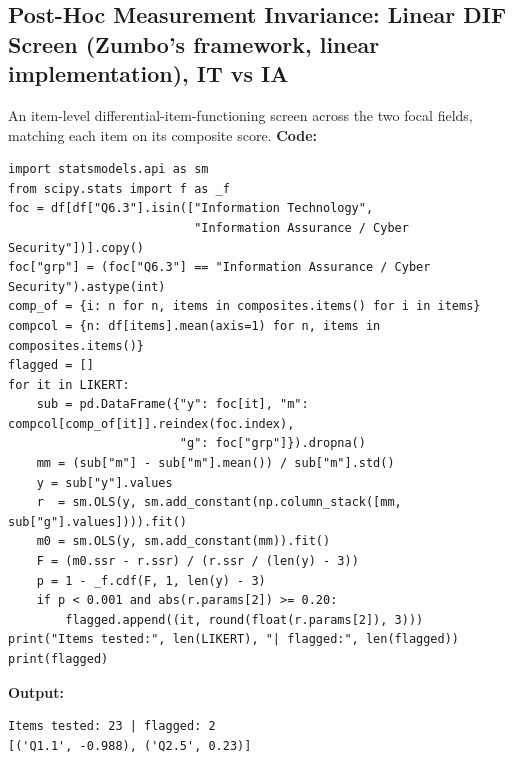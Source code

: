 \subsection{Post-Hoc Measurement Invariance: Linear DIF Screen (Zumbo's framework, linear implementation), IT vs IA}
An item-level differential-item-functioning screen across the two focal fields, matching each item on its composite score.
\noindent\textbf{Code:}\nopagebreak
{\tiny\begin{verbatim}
import statsmodels.api as sm
from scipy.stats import f as _f
foc = df[df["Q6.3"].isin(["Information Technology",
                          "Information Assurance / Cyber Security"])].copy()
foc["grp"] = (foc["Q6.3"] == "Information Assurance / Cyber Security").astype(int)
comp_of = {i: n for n, items in composites.items() for i in items}
compcol = {n: df[items].mean(axis=1) for n, items in composites.items()}
flagged = []
for it in LIKERT:
    sub = pd.DataFrame({"y": foc[it], "m": compcol[comp_of[it]].reindex(foc.index),
                        "g": foc["grp"]}).dropna()
    mm = (sub["m"] - sub["m"].mean()) / sub["m"].std()
    y = sub["y"].values
    r  = sm.OLS(y, sm.add_constant(np.column_stack([mm, sub["g"].values]))).fit()
    m0 = sm.OLS(y, sm.add_constant(mm)).fit()
    F = (m0.ssr - r.ssr) / (r.ssr / (len(y) - 3))
    p = 1 - _f.cdf(F, 1, len(y) - 3)
    if p < 0.001 and abs(r.params[2]) >= 0.20:
        flagged.append((it, round(float(r.params[2]), 3)))
print("Items tested:", len(LIKERT), "| flagged:", len(flagged))
print(flagged)
\end{verbatim}}
\noindent\textbf{Output:}\nopagebreak
{\scriptsize\begin{verbatim}
Items tested: 23 | flagged: 2
[('Q1.1', -0.988), ('Q2.5', 0.23)]
\end{verbatim}}

